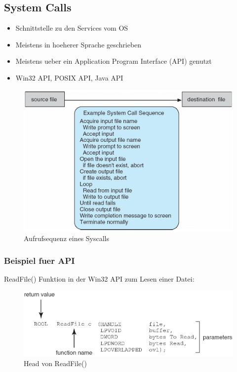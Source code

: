 \documentclass[a4paper]{scrreprt}
\begin{document}
\subsection{System Calls}
\begin{itemize}
	\item Schnittstelle zu den Services vom OS
	\item Meistens in hoeherer Sprache geschrieben
	\item Meistens ueber ein Application Program Interface (API) genutzt
	\item Win32 API, POSIX API, Java API
\end{itemize}

\begin{figure}[ht]
\centering
\includegraphics[scale=0.3]{graphics/system_call.png}
\caption{Aufrufsequenz eines Syscalls}
\end{figure}

\subsubsection{Beispiel fuer API}

ReadFile() Funktion in der Win32 API zum Lesen einer Datei:\\

\begin{figure}[ht]
\centering
\includegraphics[scale=0.4]{graphics/api.png}
\caption{Head von ReadFile()}
\end{figure}
\end{document}
